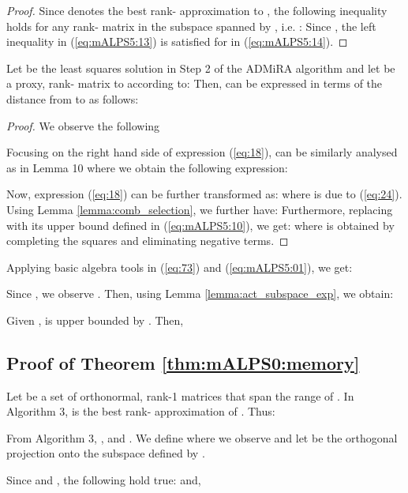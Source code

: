 \documentclass[twocolumn]{svjour3}
\begin{document}
\begin{proof}
Since  denotes the best rank- approximation to , the following inequality holds for any rank- matrix  in the subspace spanned by , i.e. :
 Since , the left inequality in (\ref{eq:mALPS5:13}) is satisfied for  in (\ref{eq:mALPS5:14}). 
\end{proof}

\begin{lemma}{\label{lemma:noname}} Let  be the least squares solution in Step 2 of the ADMiRA algorithm
and let  be a proxy, rank- matrix to  according to:  Then,  can be expressed in terms of the distance from  to  as follows:

\end{lemma}

\begin{proof}
We observe the following

Focusing on the right hand side of expression (\ref{eq:18}),  can be similarly analysed as in Lemma 10 where we obtain the following expression:


Now, expression (\ref{eq:18}) can be further transformed as:
 where  is due to (\ref{eq:24}). Using Lemma \ref{lemma:comb_selection}, we further have:
 Furthermore, replacing  with its upper bound defined in (\ref{eq:mALPS5:10}), we get:
 where  is obtained by completing the squares and eliminating negative terms. 
\end{proof}

Applying basic algebra tools in (\ref{eq:73}) and (\ref{eq:mALPS5:01}), we get:
 

Since , we observe . Then, using Lemma \ref{lemma:act_subspace_exp}, we obtain:


Given ,  is upper bounded by . Then, 




\subsection{Proof of Theorem \ref{thm:mALPS0:memory}}

Let  be a set of orthonormal, rank-1 matrices that span the range of . In Algorithm 3,  is the best rank- approximation of . Thus:


From Algorithm 3, ,   and  . We define  where we observe  and let  be the orthogonal projection onto the subspace defined by . 

Since  and , the following hold true:
 and,
 

\begin{figure*}[!htp]
 
\hrulefill
\end{figure*}
\end{document}
